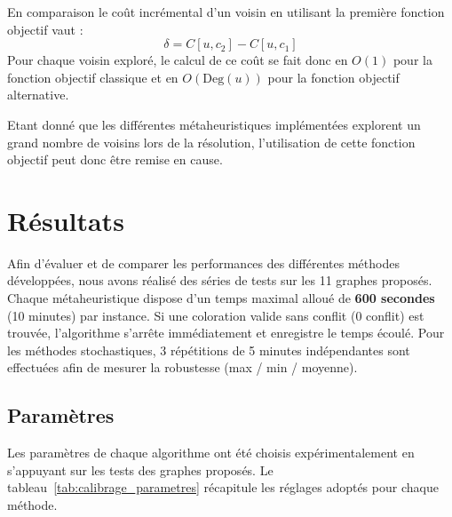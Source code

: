 \documentclass{article}
\begin{document}
En comparaison le coût incrémental d'un voisin en utilisant la première fonction objectif vaut : 
\[
\delta = C[u,c_2] - C[u,c_1]
\]
Pour chaque voisin exploré, le calcul de ce coût se fait donc en $O(1)$ pour la fonction objectif classique et en $O(\text{Deg}(u))$ pour la fonction objectif alternative.

Etant donné que les différentes métaheuristiques implémentées explorent un grand nombre de voisins lors de la résolution, l'utilisation de cette fonction objectif peut donc être remise en cause.
\section{Résultats}

Afin d'évaluer et de comparer les performances des différentes méthodes développées, nous avons réalisé des séries de tests sur les 11 graphes proposés.\\
Chaque métaheuristique dispose d'un temps maximal alloué de \textbf{600 secondes} (10 minutes) par instance. Si une coloration valide sans conflit ($0$ conflit) est trouvée, l'algorithme s'arrête immédiatement et enregistre le temps écoulé. Pour les méthodes stochastiques, 3 répétitions de 5 minutes indépendantes sont effectuées afin de mesurer la robustesse (max / min / moyenne).

\subsection{Paramètres}
Les paramètres de chaque algorithme ont été choisis expérimentalement en s'appuyant sur les tests des graphes proposés. Le tableau~\ref{tab:calibrage_parametres} récapitule les réglages adoptés pour chaque méthode.
\end{document}
